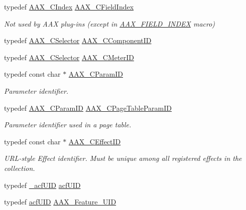 \begin{DoxyCompactItemize}
typedef \mbox{\hyperlink{a00392_a24ac375fa55ccadbc3126e6d81146c28}{A\+A\+X\+\_\+\+C\+Index}} \mbox{\hyperlink{a00392_ae807f8986143820cfb5d6da32165c9c7}{A\+A\+X\+\_\+\+C\+Field\+Index}}
\begin{DoxyCompactList}\small\item\em Not used by A\+AX plug-\/ins (except in \mbox{\hyperlink{a00392_acf807247ecd6e5899dc9dc31644e9a1d}{A\+A\+X\+\_\+\+F\+I\+E\+L\+D\+\_\+\+I\+N\+D\+EX}} macro) \end{DoxyCompactList}\item 
typedef \mbox{\hyperlink{a00392_aeaf9b387f902c50a8360ff423f4a1f23}{A\+A\+X\+\_\+\+C\+Selector}} \mbox{\hyperlink{a00392_a7e697acf597bd7024de6bb13b9845ce7}{A\+A\+X\+\_\+\+C\+Component\+ID}}
\item 
typedef \mbox{\hyperlink{a00392_aeaf9b387f902c50a8360ff423f4a1f23}{A\+A\+X\+\_\+\+C\+Selector}} \mbox{\hyperlink{a00392_a6d976263b5f3dd5d01a89d65a3b98ded}{A\+A\+X\+\_\+\+C\+Meter\+ID}}
\item 
typedef const char $\ast$ \mbox{\hyperlink{a00392_a1440c756fe5cb158b78193b2fc1780d1}{A\+A\+X\+\_\+\+C\+Param\+ID}}
\begin{DoxyCompactList}\small\item\em Parameter identifier. \end{DoxyCompactList}\item 
typedef \mbox{\hyperlink{a00392_a1440c756fe5cb158b78193b2fc1780d1}{A\+A\+X\+\_\+\+C\+Param\+ID}} \mbox{\hyperlink{a00392_ab4e01b971dac1b25632fd9f710dd8f77}{A\+A\+X\+\_\+\+C\+Page\+Table\+Param\+ID}}
\begin{DoxyCompactList}\small\item\em Parameter identifier used in a page table. \end{DoxyCompactList}\item 
typedef const char $\ast$ \mbox{\hyperlink{a00392_a4b8f04e1a56624da97ace7a28d550dcc}{A\+A\+X\+\_\+\+C\+Effect\+ID}}
\begin{DoxyCompactList}\small\item\em U\+R\+L-\/style Effect identifier. Must be unique among all registered effects in the collection. \end{DoxyCompactList}\item 
typedef \mbox{\hyperlink{a01405}{\+\_\+acf\+U\+ID}} \mbox{\hyperlink{a00392_a66d978418e20352380f1c775c9180a93}{acf\+U\+ID}}
\item 
typedef \mbox{\hyperlink{a00269_ab19414382287ff80930c48a196145214}{acf\+U\+ID}} \mbox{\hyperlink{a00392_a53d6cf8a08224b3e813333e411ce798e}{A\+A\+X\+\_\+\+Feature\+\_\+\+U\+ID}}

\end{DoxyCompactItemize}
